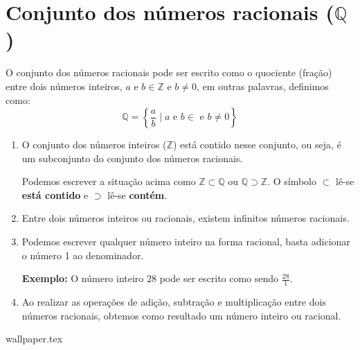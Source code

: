 \documentclass[10pt]{article}
\begin{document}
\section*{Conjunto dos números racionais (\( \mathbb{Q} \))}
O conjunto dos números racionais pode ser escrito como o quociente (fração) entre dois números inteiros, \( a \) e \(  b \in \mathbb{Z} \) e \( b \neq 0 \), em outras palavras, definimos como:
\[ \mathbb{Q} = \left\{ \frac{a}{b} \mid  a \textrm{ e } b \in \textrm{ e } b \neq 0 \right\} \]

\begin{enumerate}[label=\textbf{(\Roman*)}]
        \item O conjunto dos números inteiros (\(\mathbb{Z}\)) está contido nesse conjunto, ou seja, é um subconjunto do conjunto dos números racionais.
        \begin{obs}
        Podemos escrever a situação acima como \( \mathbb{Z} \subset \mathbb{Q} \) ou \( \mathbb{Q} \supset \mathbb{Z} \). O símbolo \( \subset \) lê-se \textbf{está contido} e \( \supset \) lê-se \textbf{contém}.
        \end{obs}
        \item Entre dois números inteiros ou racionais, existem infinitos números racionais.
        \item Podemos escrever qualquer número inteiro na forma racional, basta adicionar o número 1 ao denominador.
        
        \textbf{Exemplo:} O número inteiro \( 28 \) pode ser escrito como sendo \( \frac{28}{1} \).
        \item  Ao realizar as operações de adição, subtração e multiplicação entre dois números racionais, obtemos como resultado um número inteiro ou racional.
\end{enumerate}
\newpage
{wallpaper.tex} %
\end{document}

